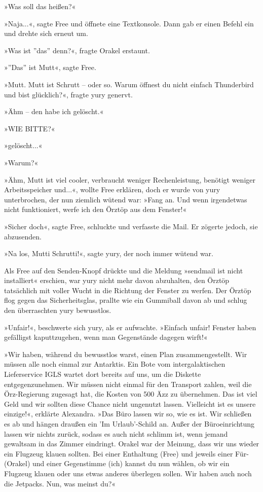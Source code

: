 »Was soll das heißen?«

»Naja...«, sagte Free und öffnete eine Textkonsole. Dann gab er einen Befehl ein und drehte sich erneut um.

»Was ist ''das'' denn?«, fragte Orakel erstaunt.

»''Das'' ist Mutt«, sagte Free.

»Mutt. Mutt ist Schrutt – oder so. Warum öffnest du nicht einfach Thunderbird und bist glücklich?«, fragte yury genervt.

»Ähm – den habe ich gelöscht.«

»WIE BITTE?«

»gelöscht...«

»Warum?«

»Ähm, Mutt ist viel cooler, verbraucht weniger Rechenleistung, benötigt weniger Arbeitsspeicher und...«, wollte Free erklären, doch er wurde von yury unterbrochen, der nun ziemlich wütend war: »Fang an. Und wenn irgendetwas nicht funktioniert, werfe ich den Örztöp aus dem Fenster!«

»Sicher doch«, sagte Free, schluckte und verfasste die Mail. Er zögerte jedoch, sie abzusenden.

»Na los, Mutti Schrutti!«, sagte yury, der noch immer wütend war.

Als Free auf den Senden-Knopf drückte und die Meldung »sendmail ist nicht installiert« erschien, war yury nicht mehr davon abzuhalten, den Örztöp tatsächlich mit voller Wucht in die Richtung der Fenster zu werfen. Der Örztöp flog gegen das Sicherheitsglas, prallte wie ein Gummiball davon ab und schlug den überraschten yury bewusstlos.

»Unfair!«, beschwerte sich yury, als er aufwachte. »Einfach unfair! Fenster haben gefälligst kaputtzugehen, wenn man Gegenstände dagegen wirft!«

»Wir haben, während du bewusstlos warst, einen Plan zusammengestellt. Wir müssen alle noch einmal zur Antarktis. Ein Bote vom intergalaktischen Lieferservice IGLS wartet dort bereits auf uns, um die Diskette entgegenzunehmen. Wir müssen nicht einmal für den Transport zahlen, weil die Örz-Regierung zugesagt hat, die Kosten von 500 Äzz zu übernehmen. Das ist viel Geld und wir sollten diese Chance nicht ungenutzt lassen. Vielleicht ist es unsere einzige!«, erklärte Alexandra. »Das Büro lassen wir so, wie es ist. Wir schließen es ab und hängen draußen ein 'Im Urlaub'-Schild an. Außer der Büroeinrichtung lassen wir nichts zurück, sodass es auch nicht schlimm ist, wenn jemand gewaltsam in das Zimmer eindringt. Orakel war der Meinung, dass wir uns wieder ein Flugzeug klauen sollten. Bei einer Enthaltung (Free) und jeweils einer Für- (Orakel) und einer Gegenstimme (ich) kannst du nun wählen, ob wir ein Flugzeug klauen oder uns etwas anderes überlegen sollen. Wir haben auch noch die Jetpacks. Nun, was meinst du?«

